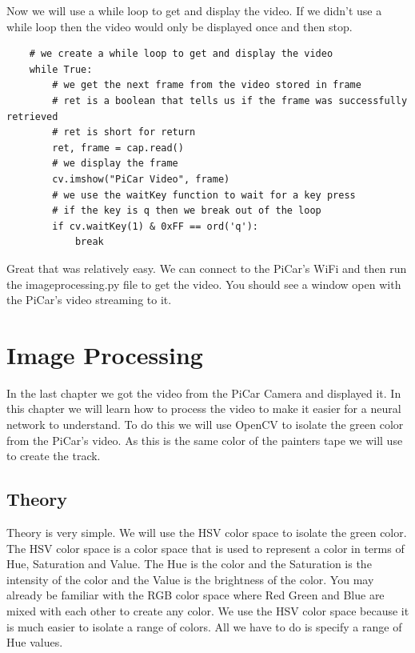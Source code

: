 \documentclass[11pt]{report}
\begin{document}
Now we will use a while loop to get and display the video. If we didn't use a while loop then the video would only be displayed once and then stop.

\begin{verbatim}
    # we create a while loop to get and display the video
    while True:
        # we get the next frame from the video stored in frame
        # ret is a boolean that tells us if the frame was successfully retrieved
        # ret is short for return
        ret, frame = cap.read()
        # we display the frame
        cv.imshow("PiCar Video", frame)
        # we use the waitKey function to wait for a key press
        # if the key is q then we break out of the loop
        if cv.waitKey(1) & 0xFF == ord('q'):
            break
\end{verbatim}

Great that was relatively easy. We can connect to the PiCar's WiFi and then run the imageprocessing.py file to get the video. You should see a window open with the PiCar's video streaming to it.

\chapter{Image Processing}
In the last chapter we got the video from the PiCar Camera and displayed it. In this chapter we will learn how to process the video to make it easier for a neural network to understand. To do this we will use OpenCV to isolate the green color from the PiCar's video. As this is the same color of the painters tape we will use to create the track.

\pagebreak

\section{Theory}
Theory is very simple. We will use the HSV color space to isolate the green color. The HSV color space is a color space that is used to represent a color in terms of Hue, Saturation and Value. The Hue is the color and the Saturation is the intensity of the color and the Value is the brightness of the color. You may already be familiar with the RGB color space where Red Green and Blue are mixed with each other to create any color. We use the HSV color space because it is much easier to isolate a range of colors. All we have to do is specify a range of Hue values. 
\end{document}
